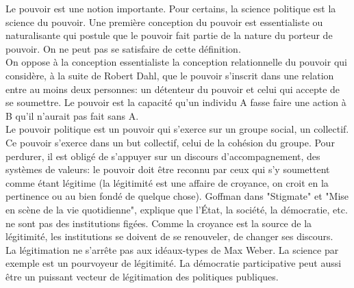 \documentclass[10pt, a4paper, openany]{book}
\begin{document}
Le pouvoir est une notion importante. Pour certains, la science politique est la science du pouvoir. Une première conception du pouvoir est essentialiste ou naturalisante qui postule que le pouvoir fait partie de la nature du porteur de pouvoir. On ne peut pas se satisfaire de cette définition. \\
On oppose à la conception essentialiste la conception relationnelle du pouvoir qui considère, à la suite de Robert Dahl, que le pouvoir s'inscrit dans une relation entre au moins deux personnes: un détenteur du pouvoir et celui qui accepte de se soumettre. Le pouvoir est la capacité qu'un individu A fasse faire une action à B qu'il n'aurait pas fait sans A. \\
Le pouvoir politique est un pouvoir qui s'exerce sur un groupe social, un collectif. Ce pouvoir s'exerce dans un but collectif, celui de la cohésion du groupe. Pour perdurer, il est obligé de s'appuyer sur un discours d'accompagnement, des systèmes de valeurs: le pouvoir doit être reconnu par ceux qui s'y soumettent comme étant légitime (la légitimité est une affaire de croyance, on croit en la pertinence ou au bien fondé de quelque chose). Goffman dans "Stigmate" et "Mise en scène de la vie quotidienne", explique que l'État, la société, la démocratie, etc. ne sont pas des institutions figées. Comme la croyance est la source de la légitimité, les institutions se doivent de se renouveler, de changer ses discours. \\
La légitimation ne s'arrête pas aux idéaux-types de Max Weber. La science par exemple est un pourvoyeur de légitimité. La démocratie participative peut aussi être un puissant vecteur de légitimation des politiques publiques.
\end{document}
